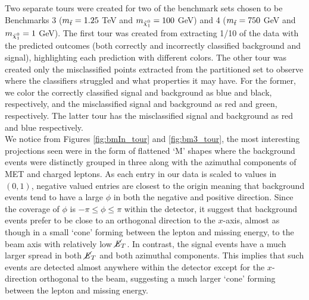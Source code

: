 Two separate tours were created for two of the benchmark sets chosen to be Benchmarks 3 ($m_{\Tilde{t}} = 1.25$ TeV and $m_{\Tilde{\chi}_1^0} = 100$ GeV) and 4 ($m_{\Tilde{t}} = 750$ GeV and $m_{\Tilde{\chi}_1^0} = 1$ GeV). The first tour was created from extracting 1/10 of the data with the predicted outcomes (both correctly and incorrectly classified background and signal), highlighting each prediction with different colors. The other tour was created only the misclassified points extracted from the partitioned set to observe where the classifiers struggled and what properties it may have. For the former, we color the correctly classified signal and background as blue and black, respectively, and the misclassified signal and background as red and green, respectively. The latter tour has the misclassified signal and background as red and blue respectively. \\

We notice from Figures \ref{fig:bmIn_tour} and \ref{fig:bm3_tour}, the most interesting projections seen were in the form of flattened `M' shapes where the background events were distinctly grouped in three along with the azimuthal components of MET and charged leptons. As each entry in our data is scaled to values in $(0,1)$, negative valued entries are closest to the origin meaning that background events tend to have a large $\phi$ in both the negative and positive direction. Since the coverage of $\phi$ is $-\pi \le \phi \le \pi$ within the detector, it suggest that background events prefer to be close to an orthogonal direction to the $x$-axis, almost as though in a small `cone' forming between the lepton and missing energy, to the beam axis with relatively low $\cancel{\it{E}}_{T}$. In contrast, the signal events have a much larger spread in both $\cancel{\it{E}}_{T}$ and both azimuthal components. This implies that such events are detected almost anywhere within the detector except for the $x$-direction orthogonal to the beam, suggesting a much larger `cone' forming between the lepton and missing energy. \\

